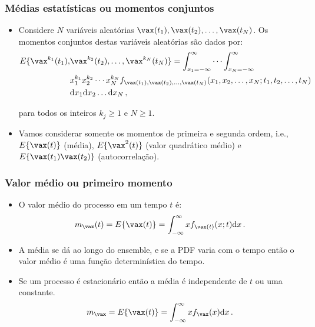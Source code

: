 \begin{frame}
    \frametitle{Médias estatísticas ou momentos conjuntos}

    \begin{itemize}
     \item Considere $N$ variáveis aleatórias $\vax(t_1),\vax(t_2),\ldots,\vax(t_N)$. Os momentos conjuntos destas variáveis aleatórias são dados por:
    \begin{align*}
	E\{\vax^{k_1}(t_1),&\vax^{k_2}(t_2),\ldots,\vax^{k_N}(t_N)\} = \int_{x_1=-\infty}^{\infty} \cdots \int_{x_N=-\infty}^{\infty} \\
	&x_1^{k_1}x_2^{k_2} \cdots x_N^{k_N} f_{\vax(t_1),\vax(t_2),\ldots,\vax(t_N)}(x_1,x_2,\ldots,x_N; t_1,t_2,\ldots,t_N) \\
	& \mathrm{d}x_1 \mathrm{d}x_2 \ldots \mathrm{d}x_N \, ,
    \end{align*}

      para todos os inteiros $k_j \geq 1$ e $N \geq 1$.
      
      \item Vamos considerar somente os momentos de primeira e segunda ordem, i.e., $E\{\vax(t)\}$ (média), $E\{\vax^2(t)\}$ (valor quadrático médio) e $E\{\vax(t_1)\vax(t_2)\}$ (autocorrelação).
    \end{itemize}
     
\end{frame}

\begin{frame}
    \frametitle{Valor médio ou primeiro momento}

    \begin{itemize}
     \item O valor médio do processo em um tempo $t$ é:
      \begin{equation}
	  m_{\vax}(t) = E\{\vax(t)\} = \int_{-\infty}^{\infty} x f_{\vax(t)} (x;t) \mathrm{d}x \, .
      \end{equation}
      \item A média se dá ao longo do ensemble, e se a PDF varia com o tempo então o valor médio é uma função determinística do tempo.
      \item Se um processo é estacionário então a média é independente de $t$ ou uma constante.
\	\begin{equation}
 	 m_{\vax} = E\{\vax(t)\} = \int_{-\infty}^{\infty}x f_{\vax}(x) \mathrm{d}x \, . 
 	\end{equation}

    \end{itemize}
     
\end{frame}

